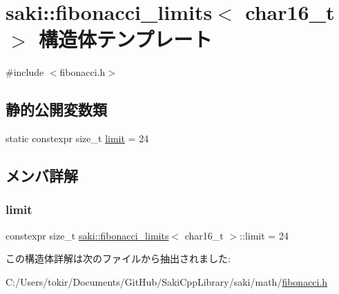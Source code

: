 \hypertarget{structsaki_1_1fibonacci__limits_3_01char16__t_01_4}{}\section{saki\+:\+:fibonacci\+\_\+limits$<$ char16\+\_\+t $>$ 構造体テンプレート}
\label{structsaki_1_1fibonacci__limits_3_01char16__t_01_4}


{\ttfamily \#include $<$fibonacci.\+h$>$}

\subsection*{静的公開変数類}
\begin{DoxyCompactItemize}
\item 
static constexpr size\+\_\+t \mbox{\hyperlink{structsaki_1_1fibonacci__limits_3_01char16__t_01_4_af352a6bb89e5e4cba18c13a927a3a632}{limit}} = 24
\end{DoxyCompactItemize}


\subsection{メンバ詳解}
\mbox{\label{structsaki_1_1fibonacci__limits_3_01char16__t_01_4_af352a6bb89e5e4cba18c13a927a3a632}} 
\subsubsection{\texorpdfstring{limit}{limit}}
{\footnotesize\ttfamily constexpr size\+\_\+t \mbox{\hyperlink{structsaki_1_1fibonacci__limits}{saki\+::fibonacci\+\_\+limits}}$<$ char16\+\_\+t $>$\+::limit = 24\hspace{0.3cm}{\ttfamily [static]}}



この構造体詳解は次のファイルから抽出されました\+:\begin{DoxyCompactItemize}
\item 
C\+:/\+Users/tokir/\+Documents/\+Git\+Hub/\+Saki\+Cpp\+Library/saki/math/\mbox{\hyperlink{fibonacci_8h}{fibonacci.\+h}}\end{DoxyCompactItemize}
